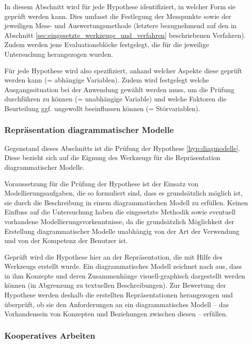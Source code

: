 In diesem Abschnitt wird für jede Hypothese identifiziert, in welcher Form sie geprüft werden kann. Dies umfasst die Festlegung der Messpunkte sowie der jeweiligen Mess- und Auswertungsmethode (letztere bezugnehmend auf den in Abschnitt \ref{sec:eingesetzte_werkzeuge_und_verfahren} beschriebenen Verfahren). Zudem werden jene Evaluationsblöcke festgelegt, die für die jeweilige Untersuchung herangezogen wurden.

Für jede Hypothese wird also spezifiziert, anhand welcher Aspekte diese geprüft werden kann (= abhängige Variablen). Zudem wird festgelegt welche Ausgangssituation bei der Anwendung gewählt werden muss, um die Prüfung durchführen zu können (= unabhängige Variable) und welche Faktoren die Beurteilung ggf. ungewollt beeinflussen können (= Störvariablen).

\subsubsection{Repräsentation diagrammatischer Modelle} %
\label{ssub:repräsentation}

Gegenstand dieses Abschnitts ist die Prüfung der Hypothese \ref{hyp:diagmodelle}. Diese bezieht sich auf die Eignung des Werkzeugs für die Repräsentation diagrammatischer Modelle.

Voraussetzung für die Prüfung der Hypothese ist der Einsatz von Modellierungsaufgaben, die so formuliert sind, dass es grundsätzlich möglich ist, sie durch die Beschreibung in einem diagrammatischen Modell zu erfüllen. Keinen Einfluss auf die Untersuchung haben die eingesetzte Methodik sowie eventuell vorhandene Modellierungsvorkenntnisse, da die grundsätzlich Möglichkeit der Erstellung diagrammatischer Modelle unabhängig von der Art der Verwendung und von der Kompetenz der Benutzer ist. 

Geprüft wird die Hypothese hier an der Repräsentation, die mit Hilfe des Werkzeugs erstellt wurde. Ein diagrammatisches Modell zeichnet nach \citep{Larkin87} aus, dass in ihm Konzepte und deren Zusammenhänge visuell-graphisch dargestellt werden können (in Abgrenzung zu textuellen Beschreibungen). Zur Bewertung der Hypothese werden deshalb die erstellten Repräsentationen herangezogen und überprüft, ob sie den Anforderungen an ein diagrammatisches Modell -- das Vorhandensein von Konzepten und Beziehungen zwischen diesen -- erfüllen.


\subsubsection{Kooperatives Arbeiten} %
\label{ssub:kollaboratives_arbeiten}

